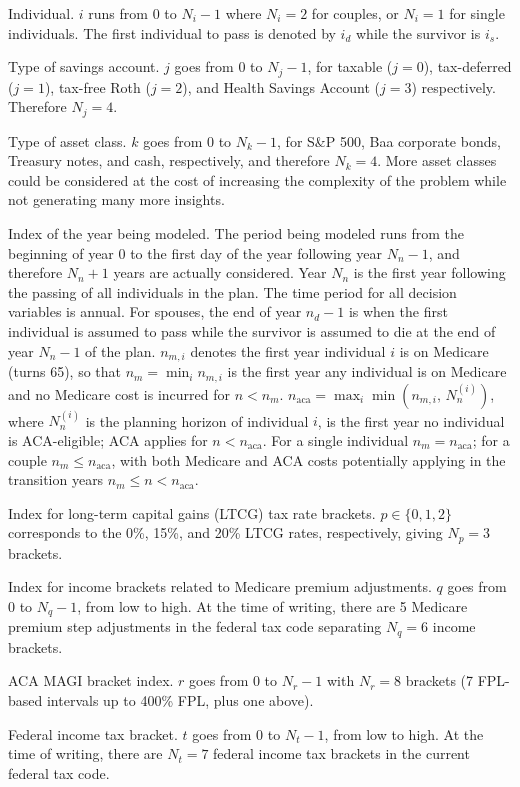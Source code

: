 \documentclass[fleqn,12pt]{report}
\begin{document}
\begin{description}[leftmargin=4em,style=multiline]
\item [$i$]
	Individual. $i$ runs from 0 to $N_i - 1$ where $N_i = 2$ for couples,
	or $N_i= 1$ for single individuals. The first individual to pass
	is denoted by $i_d$ while the survivor is $i_s$.
\item [$j$]
	Type of savings account. $j$ goes from 0 to $N_j - 1$, for taxable ($j=0$),
	tax-deferred ($j=1$), tax-free Roth ($j=2$), and Health Savings Account ($j=3$)
	respectively. Therefore $N_j = 4$.
\item[$k$]
	Type of asset class. $k$ goes from 0 to $N_k - 1$, for S\&P 500,
	Baa corporate bonds, Treasury notes, and cash, respectively,
        and therefore $N_k = 4$.
	More asset classes could be considered at the cost of increasing
	the complexity of the problem while not generating many more insights.
\item [$n$]
	Index of the year being modeled. The period being modeled runs from the beginning of year 0 to
	the first day of the year following year $N_n-1$, and therefore $N_n + 1$ years are actually considered.
	Year $N_n$ is the first year following the passing of all
	individuals in the plan. The time period for all decision variables is annual.
	For spouses, the end of year $n_d-1$ is when the first individual is assumed to pass while
	the survivor is assumed to die at the end of year $N_n-1$ of the plan.
	$n_{m,i}$ denotes the first year individual $i$ is on Medicare (turns 65),
	so that $n_m = \min_i n_{m,i}$ is the first year any individual is on Medicare
	and no Medicare cost is incurred for $n < n_m$.
	$n_{\mathrm{aca}} = \max_i \min(n_{m,i},\, N_n^{(i)})$, where $N_n^{(i)}$ is the
	planning horizon of individual $i$, is the first year no individual is ACA-eligible;
	ACA applies for $n < n_{\mathrm{aca}}$.
	For a single individual $n_m = n_{\mathrm{aca}}$; for a couple $n_m \le n_{\mathrm{aca}}$,
	with both Medicare and ACA costs potentially applying in the transition years $n_m \le n < n_{\mathrm{aca}}$.
\item [$p$]
	Index for long-term capital gains (LTCG) tax rate brackets.
	$p \in \{0, 1, 2\}$ corresponds to the 0\%, 15\%, and 20\% LTCG rates, respectively,
	giving $N_p = 3$ brackets.
\item [$q$]
	Index for income brackets related to Medicare premium adjustments.
	$q$ goes from 0 to $N_q - 1$, from low to high.
	At the time of writing, there are 5 Medicare premium step adjustments
        in the federal tax code separating $N_q = 6$ income brackets.
\item [$r$]
	ACA MAGI bracket index. $r$ goes from 0 to $N_r - 1$ with $N_r = 8$ brackets
	(7 FPL-based intervals up to 400\% FPL, plus one above).
\item [$t$]
	Federal income tax bracket. $t$ goes from 0 to $N_t - 1$, from low to high.
	At the time of writing, there are $N_t = 7$ federal income tax brackets in the current federal tax code.
\end{description}
\end{document}
